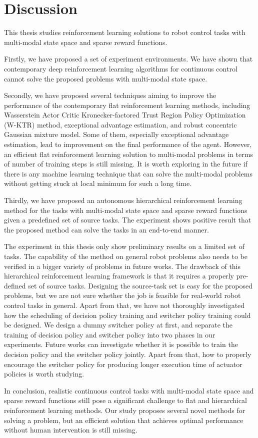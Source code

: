 \chapter{Discussion}
This thesis studies reinforcement learning solutions to robot control tasks with multi-modal state space and sparse reward functions.

Firstly, we have proposed a set of experiment environments. We have shown that contemporary deep reinforcement learning algorithms for continuous control cannot solve the proposed problems with multi-modal state space. 

Secondly, we have proposed several techniques aiming to improve the performance of the contemporary flat reinforcement learning methods, including Wasserstein Actor Critic Kronecker-factored Trust Region Policy Optimization (W-KTR) method, exceptional advantage estimation, and robust concentric Gaussian mixture model. Some of them, especially exceptional advantage estimation, lead to improvement on the final performance of the agent. However, an efficient flat reinforcement learning solution to multi-modal problems in terms of number of training steps is still missing. It is worth exploring in the future if there is any machine learning technique that can solve the multi-modal problems without getting stuck at local minimum for such a long time.

Thirdly, we have proposed an autonomous hierarchical reinforcement learning method for the tasks with multi-modal state space and sparse reward functions given a predefined set of source tasks. The experiment shows positive result that the proposed method can solve the tasks in an end-to-end manner.

The experiment in this thesis only show preliminary results on a limited set of tasks. The capability of the method on general robot problems also needs to be verified in a bigger variety of problems in future works. The drawback of this hierarchical reinforcement learning framework is that it requires a properly pre-defined set of source tasks. Designing the source-task set is easy for the proposed problems, but we are not sure whether the job is feasible for real-world robot control tasks in general. Apart from that, we have not thoroughly investigated how the scheduling of decision policy training and switcher policy training could be designed. We design a dummy switcher policy at first, and separate the training of decision policy and switcher policy into two phases in our experiments. Future works can investigate whether it is possible to train the decision policy and the switcher policy jointly. Apart from that, how to properly encourage the switcher policy for producing longer execution time of actuator policies is worth studying.

In conclusion, realistic continuous control tasks with multi-modal state space and sparse reward functions still pose a significant challenge to flat and hierarchical reinforcement learning methods. Our study proposes several novel methods for solving a problem, but an efficient solution that achieves optimal performance without human intervention is still missing.